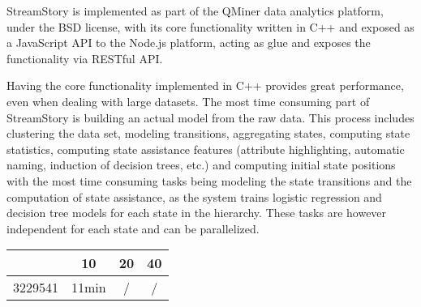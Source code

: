 StreamStory is implemented as part of the QMiner \cite{qminer} data analytics platform,
under the BSD license, with its core functionality written in C++ and exposed as a 
JavaScript API to the Node.js platform, acting as glue and exposes the functionality
via RESTful API.

Having the core functionality implemented in C++ provides great performance, even when
dealing with large datasets. The most time consuming part of StreamStory is building
an actual model from the raw data. This process includes clustering the data set,
modeling transitions, aggregating states, computing state statistics, computing state assistance
features (attribute highlighting, automatic naming, induction of decision trees, etc.) and
computing initial state positions with the most time consuming tasks being modeling the state
transitions and the computation of state assistance, as the system trains logistic regression
and decision tree models for each state in the hierarchy. These tasks are however independent
for each state and can be parallelized.

\begin{tabular}{ c | c c c}
	\label{tab:time-tests}
	 & 10 & 20 & 40 \\
	\hline
	3229541 & 11min & / & /
\end{tabular}